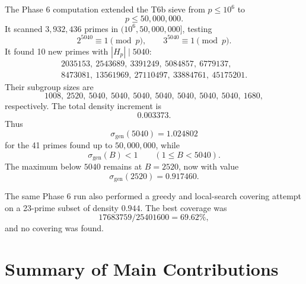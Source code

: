 \documentclass[11pt]{article}
\theoremstyle{definition}
\theoremstyle{remark}
\begin{document}
The Phase 6 computation extended the T6b sieve from \(p\leq 10^6\) to
\[
        p\leq 50{,}000{,}000.
\]
It scanned \(3{,}932{,}436\) primes in \((10^6,50{,}000{,}000]\), testing
\[
        2^{5040}\equiv 1\pmod p,\qquad
        3^{5040}\equiv 1\pmod p.
\]
It found 10 new primes with \(|H_p|\mid 5040\):
\[
\begin{gathered}
2035153,\ 2543689,\ 3391249,\ 5084857,\ 6779137,\\
8473081,\ 13561969,\ 27110497,\ 33884761,\ 45175201.
\end{gathered}
\]
Their subgroup sizes are
\[
        1008,\ 2520,\ 5040,\ 5040,\ 5040,\ 5040,\ 5040,\ 5040,\ 5040,\ 1680,
\]
respectively.  The total density increment is
\[
        0.003373.
\]
Thus
\[
        \sigma_{\mathrm{gen}}(5040)=1.024802
\]
for the 41 primes found up to \(50{,}000{,}000\), while
\[
        \sigma_{\mathrm{gen}}(B)<1
        \qquad(1\leq B<5040).
\]
The maximum below \(5040\) remains at \(B=2520\), now with value
\[
        \sigma_{\mathrm{gen}}(2520)=0.917460.
\]

The same Phase 6 run also performed a greedy and local-search covering attempt
on a 23-prime subset of density \(0.944\).  The best coverage was
\[
        17683759/25401600=69.62\%,
\]
and no covering was found.

\section{Summary of Main Contributions}
\end{document}
